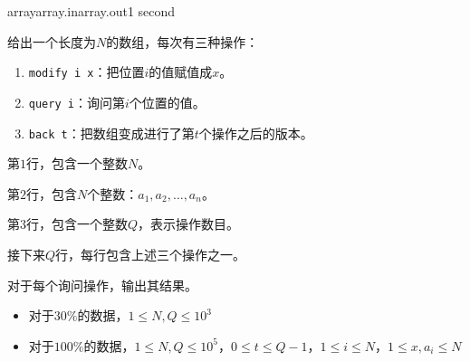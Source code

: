 \documentclass[11pt,a4paper,oneside]{article}
\begin{document}
\begin{problem}{array}{array.in}{array.out}{1 second} 
	
	给出一个长度为$N$的数组，每次有三种操作：
	
	\begin{enumerate}
		\item \texttt{modify i x}：把位置$i$的值赋值成$x$。
		\item \texttt{query i}：询问第$i$个位置的值。
		\item \texttt{back t}：把数组变成进行了第$t$个操作之后的版本。
	\end{enumerate}
	
    \InputFile
    
    第$1$行，包含一个整数$N$。
    
    第$2$行，包含$N$个整数：$a_1,a_2,\dots,a_n$。
    
    第$3$行，包含一个整数$Q$，表示操作数目。
    
    接下来$Q$行，每行包含上述三个操作之一。
    
    \OutputFile

	对于每个询问操作，输出其结果。

    \Example

    \begin{example}
    \end{example}

   \Note
    \begin{itemize}
		\item 对于$30\%$的数据，$1 \leq N, Q \leq 10^3$
		\item 对于$100\%$的数据，$1 \leq N, Q \leq 10^5$，$0 \leq t \leq Q-1$，$1 \leq i \leq N$，$1 \leq x, a_i\leq N$
    \end{itemize}

\end{problem}
\end{document}

